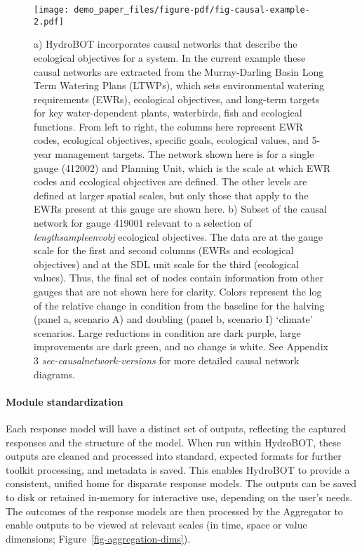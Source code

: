 \documentclass[
  number]{elsarticle}
\let\oldparagraph\paragraph
\renewcommand{\paragraph}[1]{\oldparagraph{#1}\mbox{}}
\begin{document}
\begin{figure}

{\centering \texttt{[image: demo\_paper\_files/figure-pdf/fig-causal-example-2.pdf]}

}

\caption{\label{fig-causal-example-2}a) HydroBOT incorporates causal
networks that describe the ecological objectives for a system. In the
current example these causal networks are extracted from the
Murray-Darling Basin Long Term Watering Plans (LTWPs), which sets
environmental watering requirements (EWRs), ecological objectives, and
long-term targets for key water-dependent plants, waterbirds, fish and
ecological functions. From left to right, the columns here represent EWR
codes, ecological objectives, specific goals, ecological values, and
5-year management targets. The network shown here is for a single gauge
(412002) and Planning Unit, which is the scale at which EWR codes and
ecological objectives are defined. The other levels are defined at
larger spatial scales, but only those that apply to the EWRs present at
this gauge are shown here. b) Subset of the causal network for gauge
419001 relevant to a selection of \emph{lengthsampleenvobj} ecological
objectives. The data are at the gauge scale for the first and second
columns (EWRs and ecological objectives) and at the SDL unit scale for
the third (ecological values). Thus, the final set of nodes contain
information from other gauges that are not shown here for clarity.
Colors represent the log of the relative change in condition from the
baseline for the halving (panel a, scenario A) and doubling (panel b,
scenario I) `climate' scenarios. Large reductions in condition are dark
purple, large improvements are dark green, and no change is white. See
Appendix 3 \emph{sec-causalnetwork-versions} for more detailed causal
network diagrams.}

\end{figure}

\hypertarget{module-standardization}{%
\paragraph{Module standardization}\label{module-standardization}}

Each response model will have a distinct set of outputs, reflecting the
captured responses and the structure of the model. When run within
HydroBOT, these outputs are cleaned and processed into standard,
expected formats for further toolkit processing, and metadata is saved.
This enables HydroBOT to provide a consistent, unified home for
disparate response models. The outputs can be saved to disk or retained
in-memory for interactive use, depending on the user's needs. The
outcomes of the response models are then processed by the Aggregator to
enable outputs to be viewed at relevant scales (in time, space or value
dimensions; Figure~\ref{fig-aggregation-dims}).
\end{document}
